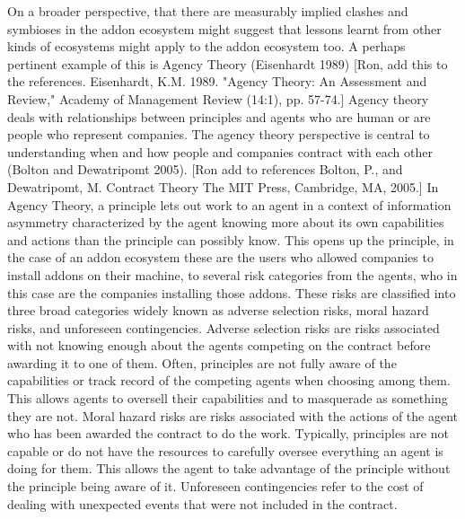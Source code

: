 \documentclass{article} %
\begin{document}
On a broader perspective, that there are measurably implied clashes and symbioses in the addon ecosystem might suggest that lessons learnt from other kinds of ecosystems might apply to the addon ecosystem too. A perhaps pertinent example of this is Agency Theory (Eisenhardt 1989) [Ron, add this to the references. Eisenhardt, K.M. 1989. "Agency Theory: An Assessment and Review," Academy of Management Review (14:1), pp. 57-74.] Agency theory deals with relationships between principles and agents who are human or are people who represent companies. The agency theory perspective is central to understanding when and how people and companies contract with each other (Bolton and Dewatripomt 2005). [Ron add to references Bolton, P., and Dewatripomt, M. Contract Theory The MIT Press, Cambridge, MA, 2005.] In Agency Theory, a principle lets out work to an agent in a context of information asymmetry characterized by the agent knowing more about its own capabilities and actions than the principle can possibly know. This opens up the principle, in the case of an addon ecosystem these are the users who allowed companies to install addons on their machine, to several risk categories from the agents, who in this case are the companies installing those addons. These risks are classified into three broad categories widely known as adverse selection risks, moral hazard risks, and unforeseen contingencies. Adverse selection risks are risks associated with not knowing enough about the agents competing on the contract before awarding it to one of them. Often, principles are not fully aware of the capabilities or track record of the competing agents when choosing among them. This allows agents to oversell their capabilities and to masquerade as something they are not. Moral hazard risks are risks associated with the actions of the agent who has been awarded the contract to do the work. Typically, principles are not capable or do not have the resources to carefully oversee everything an agent is doing for them. This allows the agent to take advantage of the principle without the principle being aware of it. Unforeseen contingencies refer to the cost of dealing with unexpected events that were not included in the contract. 
\end{document}
